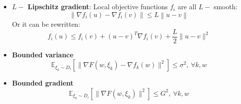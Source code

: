\documentclass{article}
\theoremstyle{theorem}
\theoremstyle{definition}
\begin{document}
\section{}
\begin{itemize}
	\item \textbf{$L-$ Lipschitz gradient}: Local objective functions $f_i$ are all $L-$ smooth: $$\left\|\nabla f_i(u)-\nabla f_i(v) \right\| \leq L \left \| u-v \right\|$$	Or it can be rewritten: $$f_i(u) \le f_i(v)+(u-v)^{T} \nabla f_i(v)+\frac{L}{2} \|u-v\|^2$$
	\item \textbf{Bounded variance} $$\mathbb{E} _{\xi_k \sim D_i} \left[\| \nabla F(w, \xi_k)-\nabla f_k(w)\| ^2\right] \le\sigma ^2, \ \forall k,w $$
	\item 	\textbf{Bounded gradient} $$\mathbb{E} _{\xi_k \sim D_i} \left[\| \nabla F(w, \xi_k)\| ^2\right] \le G^2, \ \forall k,w $$
\end{itemize}
\end{document}
